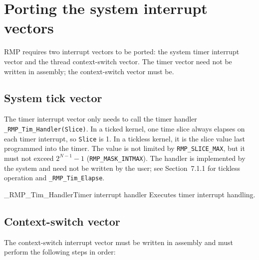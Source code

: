 \section{Porting the system interrupt vectors}

RMP requires two interrupt vectors to be ported: the system timer interrupt vector and the thread context-switch vector.
The timer vector need not be written in assembly; the context-switch vector must be.

\subsection{System tick vector}

The timer interrupt vector only needs to call the timer handler \texttt{\_RMP\_Tim\_Handler(Slice)}.
In a ticked kernel, one time slice always elapses on each timer interrupt, so \texttt{Slice} is 1.
In a tickless kernel, it is the slice value last programmed into the timer.
The value is not limited by \texttt{RMP\_SLICE\_MAX}, but it must not exceed \(2^{N-1}-1\) (\texttt{RMP\_MASK\_INTMAX}).
The handler is implemented by the system and need not be written by the user; see Section~7.1.1 for tickless operation and \texttt{\_RMP\_Tim\_Elapse}.

\begin{apidesc}{\_RMP\_Tim\_Handler}{Timer interrupt handler}\label{api:_RMP_Tim_Handler}
    Executes timer interrupt handling.
    \begin{apiparams}
    \end{apiparams}
    \begin{apiret}
    \end{apiret}
\end{apidesc}

\subsection{Context-switch vector}

The context-switch interrupt vector must be written in assembly and must perform the following steps in order:

